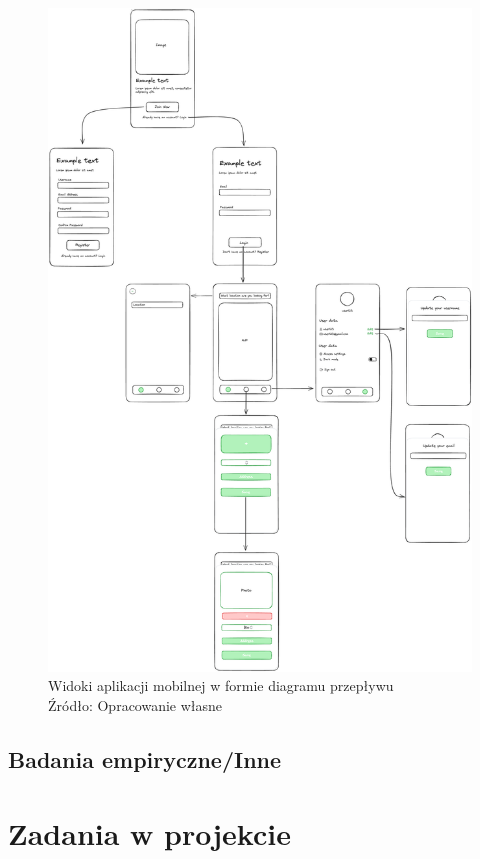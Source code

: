 \documentclass[12pt, a4paper, twoside, openany]{book}
\begin{document}
\begin{figure}[h]
    \centering
    \includegraphics[width=13.5cm]{./MobileAppFlows.png}
    \caption{Widoki aplikacji mobilnej w formie diagramu przepływu\\Źródło: Opracowanie własne}
\end{figure}

\subsection{Badania empiryczne/Inne}
\section{Zadania w projekcie}
\end{document}
